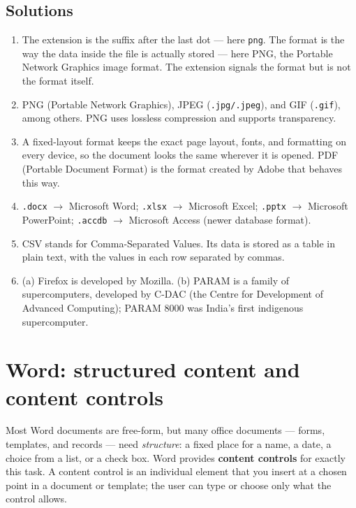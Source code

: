 \subsection*{Solutions}
\begingroup\small
\begin{enumerate}[label=\arabic*.]
  \item The extension is the suffix after the last dot --- here
    \texttt{png}. The format is the way the data inside the file is actually
    stored --- here PNG, the Portable Network Graphics image format. The
    extension signals the format but is not the format itself.
  \item PNG (Portable Network Graphics), JPEG (\texttt{.jpg/.jpeg}), and GIF
    (\texttt{.gif}), among others. PNG uses lossless compression and supports
    transparency.
  \item A fixed-layout format keeps the exact page layout, fonts, and
    formatting on every device, so the document looks the same wherever it is
    opened. PDF (Portable Document Format) is the format created by Adobe
    that behaves this way.
  \item \texttt{.docx} $\rightarrow$ Microsoft Word; \texttt{.xlsx}
    $\rightarrow$ Microsoft Excel; \texttt{.pptx} $\rightarrow$ Microsoft
    PowerPoint; \texttt{.accdb} $\rightarrow$ Microsoft Access (newer
    database format).
  \item CSV stands for Comma-Separated Values. Its data is stored as a table
    in plain text, with the values in each row separated by commas.
  \item (a) Firefox is developed by Mozilla. (b) PARAM is a family of
    supercomputers, developed by C-DAC (the Centre for Development of
    Advanced Computing); PARAM 8000 was India's first indigenous
    supercomputer.
\end{enumerate}
\endgroup

\section{Word: structured content and content controls}
Most Word documents are free-form, but many office documents --- forms,
templates, and records --- need \emph{structure}: a fixed place for a name, a
date, a choice from a list, or a check box. Word provides \textbf{content
controls} for exactly this task. A content control is an individual element
that you insert at a chosen point in a document or template; the user can type
or choose only what the control allows.

